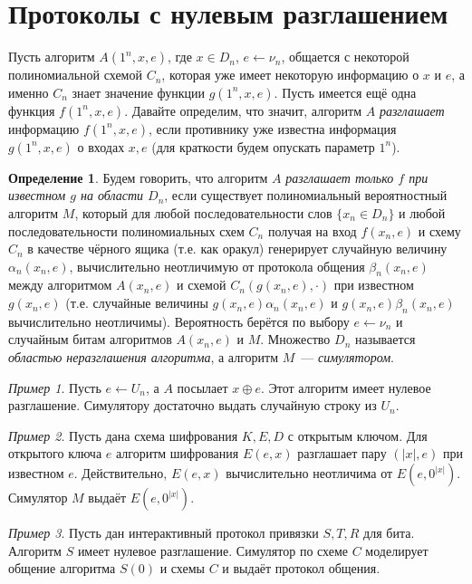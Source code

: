 \documentclass[12pt,a4paper]{article}
\theoremstyle{definition}
\newtheorem{definition}{Определение}[section]
\theoremstyle{plain}
\theoremstyle{remark}
\newtheorem{example}{Пример}[section]
\begin{document}
\section{Протоколы с нулевым разглашением}
Пусть алгоритм $A(1^n, x, e)$, где $x\in D_n$, $e\gets\nu_n$, 
общается с некоторой полиномиальной схемой $C_n$,
которая уже имеет некоторую информацию о $x$ и $e$, а именно $C_n$ знает
значение функции $g(1^n,x,e)$. Пусть имеется ещё одна функция $f(1^n,x,e)$.
Давайте определим, что значит, алгоритм $A$ \emph{разглашает} информацию $f(1^n,x,e)$,
если противнику уже известна информация $g(1^n,x,e)$ о входах $x,e$ 
(для краткости будем опускать параметр $1^n$).
\begin{definition}
Будем говорить, что алгоритм $A$ \emph{разглашает только $f$ при известном $g$ на области $D_n$},
если существует полиномиальный вероятностный алгоритм $M$, который для любой последовательности 
слов $\{x_n\in D_n\}$ и любой последовательности полиномиальных схем $C_n$
получая на вход $f(x_n,e)$ и схему $C_n$ в качестве чёрного ящика
(т.е. как оракул) генерирует случайную величину $\alpha_n(x_n, e)$,
вычислительно неотличимую от протокола общения $\beta_n(x_n, e)$ между алгоритмом $A(x_n, e)$
и схемой $C_n(g(x_n,e), \cdot)$ при известном $g(x_n,e)$ (т.е. случайные величины 
$g(x_n,e)\alpha_n(x_n, e)$ и $g(x_n,e)\beta_n(x_n, e)$ вычислительно неотличимы). Вероятность
берётся по выбору $e\gets\nu_n$ и случайным битам алгоритмов $A(x_n,e)$ и $M$.
Множество $D_n$ называется \emph{областью неразглашения алгоритма}, а алгоритм $M$~--- \emph{симулятором}.

\end{definition}
\begin{example}
Пусть $e\gets U_n$, а $A$ посылает $x\oplus e$. 
Этот алгоритм имеет нулевое разглашение. 
Симулятору достаточно выдать случайную строку из $U_n$.
\end{example}
\begin{example}
Пусть дана схема шифрования $K,E,D$ с открытым ключом. 
Для открытого ключа $e$ алгоритм шифрования $E(e,x)$ разглашает
пару $(|x|, e)$ при известном $e$. Действительно, $E(e,x)$
вычислительно неотличима от $E(e,0^{|x|})$. 
Симулятор $M$ выдаёт $E(e,0^{|x|})$.
\end{example}
\begin{example}
Пусть дан интерактивный протокол привязки $S,T,R$ для бита.
Алгоритм $S$ имеет нулевое разглашение.
Симулятор по схеме $C$ моделирует общение алгоритма $S(0)$
и схемы $C$ и выдаёт протокол общения.
\end{example}
\end{document}
